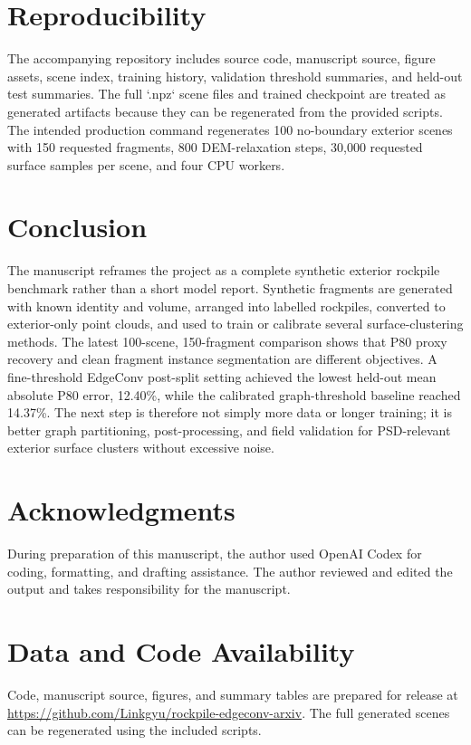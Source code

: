 \documentclass[11pt]{article}
\begin{document}
\section{Reproducibility}
The accompanying repository includes source code, manuscript source, figure assets, scene index, training history, validation threshold summaries, and held-out test summaries. The full `.npz` scene files and trained checkpoint are treated as generated artifacts because they can be regenerated from the provided scripts. The intended production command regenerates 100 no-boundary exterior scenes with 150 requested fragments, 800 DEM-relaxation steps, 30,000 requested surface samples per scene, and four CPU workers.

\section{Conclusion}
The manuscript reframes the project as a complete synthetic exterior rockpile benchmark rather than a short model report. Synthetic fragments are generated with known identity and volume, arranged into labelled rockpiles, converted to exterior-only point clouds, and used to train or calibrate several surface-clustering methods. The latest 100-scene, 150-fragment comparison shows that P80 proxy recovery and clean fragment instance segmentation are different objectives. A fine-threshold EdgeConv post-split setting achieved the lowest held-out mean absolute P80 error, 12.40\%, while the calibrated graph-threshold baseline reached 14.37\%. The next step is therefore not simply more data or longer training; it is better graph partitioning, post-processing, and field validation for PSD-relevant exterior surface clusters without excessive noise.

\section*{Acknowledgments}
During preparation of this manuscript, the author used OpenAI Codex for coding, formatting, and drafting assistance. The author reviewed and edited the output and takes responsibility for the manuscript.

\section*{Data and Code Availability}
Code, manuscript source, figures, and summary tables are prepared for release at \url{https://github.com/Linkgyu/rockpile-edgeconv-arxiv}. The full generated scenes can be regenerated using the included scripts.
\end{document}
